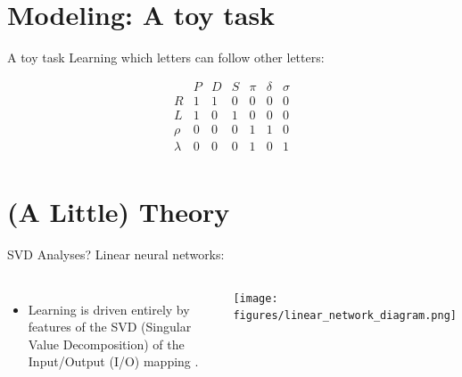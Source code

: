 \documentclass{beamer}
\begin{document}
\section{Modeling: A toy task}
\begin{frame}{A toy task}
Learning which letters can follow other letters:\vspace{-2em}
\begin{center}
\[
\begin{array}{c|cccccc} 
& P & D & S & \pi & \delta & \sigma \\
\hline
R & 1 & 1 & 0 & 0 & 0 & 0 \\
L & 1 & 0 & 1 & 0 & 0 & 0 \\
\rho & 0 & 0 & 0 & 1 & 1 & 0\\
\lambda & 0 & 0 & 0 & 1 & 0 & 1\\
\end{array} 
\]
\end{center}
\end{frame}

\section{(A Little) Theory}
\begin{frame}{SVD Analyses?}
Linear neural networks:
\begin{columns}
\begin{itemize}
    \item<2-> Learning is driven entirely by features of the SVD (Singular Value Decomposition) of the Input/Output (I/O) mapping \cite{Saxe2013}.
\end{itemize}
    \texttt{[image: figures/linear\_network\_diagram.png]}
\end{columns}
\end{frame}
\end{document}
